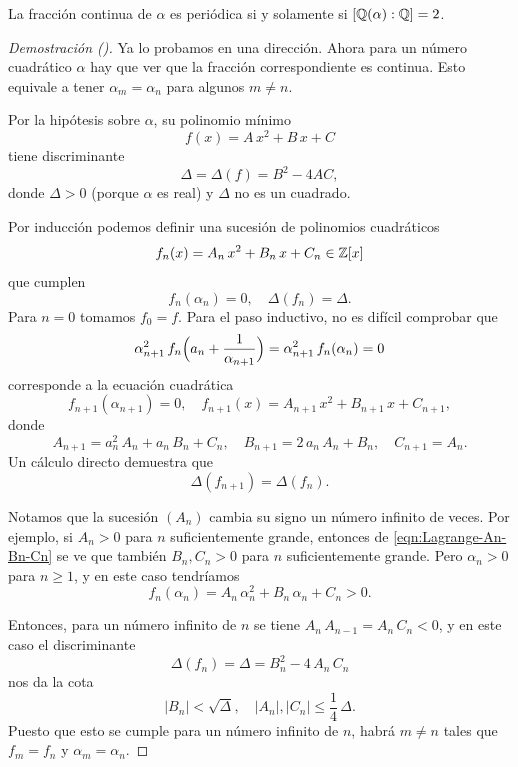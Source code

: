 \begin{teorema}[Lagrange]
  La fracción continua de $\alpha$ es periódica si y solamente si
  $[\mathbb{Q} (\alpha) : \mathbb{Q}] = 2$.

  \begin{proof}[Demostración (\cite{Steinig-1992})]
    Ya lo probamos en una dirección. Ahora para un número cuadrático $\alpha$
    hay que ver que la fracción correspondiente es continua. Esto equivale a
    tener $\alpha_m = \alpha_n$ para algunos $m \ne n$.

    Por la hipótesis sobre $\alpha$, su polinomio mínimo
    $$f (x) = A\,x^2 + B\,x + C$$
    tiene discriminante
    $$\Delta = \Delta (f) = B^2 - 4 A C,$$
    donde $\Delta > 0$ (porque $\alpha$ es real) y $\Delta$ no es un cuadrado.

    Por inducción podemos definir una sucesión de polinomios cuadráticos
    $$f_n (x) = A_n\,x^2 + B_n\,x + C_n \in \mathbb{Z} [x]$$
    que cumplen
    $$f_n (\alpha_n) = 0, \quad \Delta (f_n) = \Delta.$$
    Para $n = 0$ tomamos $f_0 = f$. Para el paso inductivo, no es difícil
    comprobar que
    $$\alpha_{n+1}^2 \, f_n \Bigl(a_n + \frac{1}{\alpha_{n+1}}\Bigr) = \alpha_{n+1}^2 \, f_n (\alpha_n) = 0$$
    corresponde a la ecuación cuadrática
    \[ f_{n+1} (\alpha_{n+1}) = 0, \quad
       f_{n+1} (x) = A_{n+1}\,x^2 + B_{n+1}\,x + C_{n+1}, \]
    donde
    \begin{equation}
      \label{eqn:Lagrange-An-Bn-Cn}
      A_{n+1} = a_n^2\,A_n + a_n\,B_n + C_n, \quad
      B_{n+1} = 2\,a_n\,A_n + B_n, \quad
      C_{n+1} = A_n.
    \end{equation}
    Un cálculo directo demuestra que
    $$\Delta (f_{n+1}) = \Delta (f_n).$$

    Notamos que la sucesión $(A_n)$ cambia su signo un número infinito de
    veces. Por ejemplo, si $A_n > 0$ para $n$ suficientemente grande, entonces
    de \eqref{eqn:Lagrange-An-Bn-Cn} se ve que también $B_n, C_n > 0$ para $n$
    suficientemente grande. Pero $\alpha_n > 0$ para $n \ge 1$, y en este caso
    tendríamos
    $$f_n (\alpha_n) = A_n\,\alpha_n^2 + B_n\,\alpha_n + C_n > 0.$$

    Entonces, para un número infinito de $n$ se tiene
    $A_n\,A_{n-1} = A_n\,C_n < 0$, y en este caso el discriminante
    $$\Delta (f_n) = \Delta = B_n^2 - 4\,A_n\,C_n$$
    nos da la cota
    $$|B_n| < \sqrt{\Delta}, \quad |A_n|, |C_n| \le \frac{1}{4}\,\Delta.$$
    Puesto que esto se cumple para un número infinito de $n$, habrá $m\ne n$
    tales que $f_m = f_n$ y $\alpha_m = \alpha_n$.
  \end{proof}
\end{teorema}

